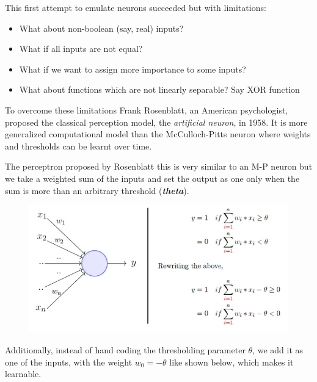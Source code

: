 \documentclass[
  letterpaper,
  DIV=11,
  numbers=noendperiod,
  oneside]{scrartcl}
\begin{document}
This first attempt to emulate neurons succeeded but with limitations:

\begin{itemize}
\item
  What about non-boolean (say, real) inputs?
\item
  What if all inputs are not equal?
\item
  What if we want to assign more importance to some inputs?
\item
  What about functions which are not linearly separable? Say XOR
  function
\end{itemize}

To overcome these limitations Frank Rosenblatt, an American
psychologist, proposed the classical perception model, the
\emph{artificial neuron}, in 1958. It is more generalized computational
model than the McCulloch-Pitts neuron where weights and thresholds can
be learnt over time.

The perceptron proposed by Rosenblatt this is very similar to an M-P
neuron but we take a weighted sum of the inputs and set the output as
one only when the sum is more than an arbitrary threshold
(\textbf{\emph{theta}}).

\begin{figure}

{\centering 

\href{https://towardsdatascience.com/perceptron-the-artificial-neuron-4d8c70d5cc8d}{\includegraphics{images/RosenblattPerceptron1.png}}

}

\end{figure}

Additionally, instead of hand coding the thresholding parameter
\(\theta\), we add it as one of the inputs, with the weight
\(w_0=-\theta\) like shown below, which makes it learnable.
\end{document}
